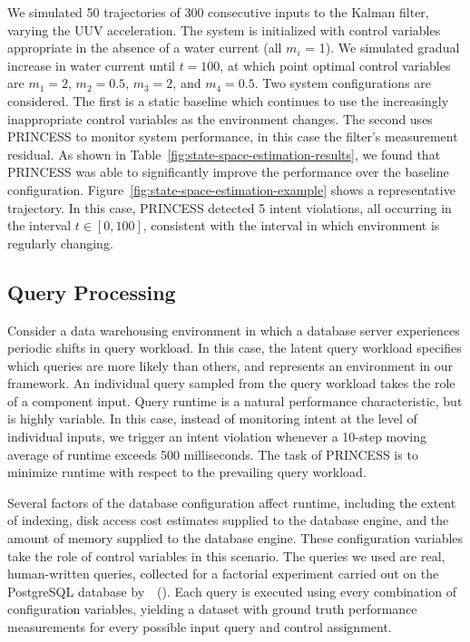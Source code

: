 \documentclass[letterpaper]{article}
\begin{document}
We simulated 50 trajectories of 300 consecutive inputs to the Kalman filter, varying the UUV acceleration.
The system is initialized with control variables appropriate in the absence of a water current (all $m_i$ = 1).
We simulated gradual increase in water current until $t=100$, at which point optimal control variables are $m_1 = 2$, $m_2 = 0.5$, $m_3 = 2$, and  $m_4 = 0.5$.
Two system configurations are considered.
The first is a static baseline which continues to use the increasingly inappropriate control variables as the environment changes.
The second uses PRINCESS to monitor system performance, in this case the filter's measurement residual.
As shown in Table~\ref{fig:state-space-estimation-results}, we found that PRINCESS was able to significantly improve the performance over the baseline configuration. Figure~\ref{fig:state-space-estimation-example} shows a representative trajectory. In this case, PRINCESS detected 5 intent violations, all occurring in the interval $t \in [0, 100]$, consistent with the interval in which environment is regularly changing.

\subsection{Query Processing}

Consider a data warehousing environment in which a database server experiences periodic shifts in query workload.
In this case, the latent query workload specifies which queries are more likely than others, and represents an environment in our framework.
An individual query sampled from the query workload takes the role of a component input.
Query runtime is a natural performance characteristic, but is highly variable.
In this case, instead of monitoring intent at the level of individual inputs, we trigger an intent violation whenever a 10-step moving average of runtime exceeds 500 milliseconds.
The task of PRINCESS is to minimize runtime with respect to the prevailing query workload.

Several factors of the database configuration affect runtime, including the extent of indexing, disk access cost estimates supplied to the database engine, and the amount of memory supplied to the database engine.
These configuration variables take the role of control variables in this scenario.
The queries we used are real, human-written queries, collected for a factorial experiment carried out on the PostgreSQL database by~\citeauthor{garant2016evaluating}~(\citeyear{garant2016evaluating}).
Each query is executed using every combination of configuration variables, yielding a dataset with ground truth performance measurements for every possible input query and control assignment.
\end{document}
